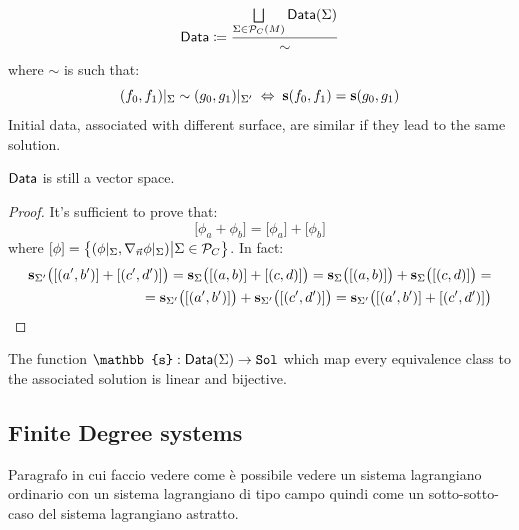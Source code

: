 \documentclass[Main]{subfiles}
\begin{document}
			\begin{definition}
				\begin{displaymath}
					\mathsf{Data}  \coloneqq \frac{\bigsqcup\limits_{\Sigma \in \mathcal{P}_C(M)}\mathsf{Data}(\Sigma)}{\sim} 
				\end{displaymath}
				where $\sim$ is such that:
				\begin{displaymath}
					(f_0, f_1)|_\Sigma \sim (g_0, g_1)|_{\Sigma'} \; \Leftrightarrow \; \mathbf{s}(f_0,f_1) =  \mathbf{s}(g_0,g_1) 
				\end{displaymath}
				\footnotesize{ Initial data, associated with different surface, are similar if they lead to the same solution.}	
			\end{definition}
			
			\begin{proposition}
				$\mathsf{Data}$ is still a vector space.
			\end{proposition}
			\begin{proof}\danger
				It's sufficient to prove that:
				\begin{displaymath}
					\big[ \phi_a + \phi_b \big] = \big[ \phi_a \big] + \big[ \phi_b \big]
				\end{displaymath}
				where $[\phi]= \big\{(\phi\vert_\Sigma , \nabla_{\vec{n}}\phi \vert_\Sigma) \big\vert \Sigma \in \mathcal{P}_C \big\}$.
				In fact:
				\begin{align*}
					 \mathbf{s}_{\Sigma'}\big([(a',b')] + [(c',d')] \big)=\mathbf{s}_\Sigma\big([(a,b)] + [(c,d)] \big) = \mathbf{s}_\Sigma\big([(a,b)] \big)+ \mathbf{s}_\Sigma\big([(c,d)] \big) =\\
					 =\mathbf{s}_{\Sigma'}\big([(a',b')] \big)+ \mathbf{s}_{\Sigma'}\big([(c',d')] \big) = \mathbf{s}_{\Sigma'}\big([(a',b')] +[(c',d')] \big)
				\end{align*}

			\end{proof}
			\begin{corollary}
				The function  $ 	 \mathbb{s} : \Data (\Sigma ) \rightarrow \Sol $ which map every equivalence class to the associated solution is linear and bijective.
			\end{corollary}


		\subsection{Finite Degree systems}
			\danger
			
				Paragrafo in cui faccio vedere come è possibile vedere un sistema lagrangiano ordinario con un sistema lagrangiano di tipo campo quindi come un sotto-sotto-caso del sistema lagrangiano astratto.
			
\end{document}
